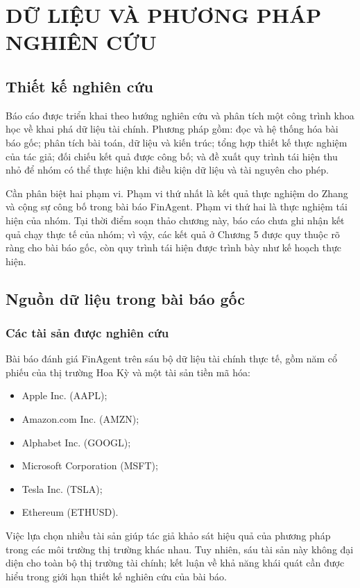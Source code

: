 \chapter{DỮ LIỆU VÀ PHƯƠNG PHÁP NGHIÊN CỨU}

\section{Thiết kế nghiên cứu}

Báo cáo được triển khai theo hướng nghiên cứu và phân tích một công trình khoa học về khai phá dữ liệu tài chính. Phương pháp gồm: đọc và hệ thống hóa bài báo gốc; phân tích bài toán, dữ liệu và kiến trúc; tổng hợp thiết kế thực nghiệm của tác giả; đối chiếu kết quả được công bố; và đề xuất quy trình tái hiện thu nhỏ để nhóm có thể thực hiện khi điều kiện dữ liệu và tài nguyên cho phép.

Cần phân biệt hai phạm vi. Phạm vi thứ nhất là kết quả thực nghiệm do Zhang và cộng sự công bố trong bài báo FinAgent. Phạm vi thứ hai là thực nghiệm tái hiện của nhóm. Tại thời điểm soạn thảo chương này, báo cáo chưa ghi nhận kết quả chạy thực tế của nhóm; vì vậy, các kết quả ở Chương 5 được quy thuộc rõ ràng cho bài báo gốc, còn quy trình tái hiện được trình bày như kế hoạch thực hiện.

\section{Nguồn dữ liệu trong bài báo gốc}

\subsection{Các tài sản được nghiên cứu}
Bài báo đánh giá FinAgent trên sáu bộ dữ liệu tài chính thực tế, gồm năm cổ phiếu của thị trường Hoa Kỳ và một tài sản tiền mã hóa:
\begin{itemize}
    \item Apple Inc. (AAPL);
    \item Amazon.com Inc. (AMZN);
    \item Alphabet Inc. (GOOGL);
    \item Microsoft Corporation (MSFT);
    \item Tesla Inc. (TSLA);
    \item Ethereum (ETHUSD).
\end{itemize}
Việc lựa chọn nhiều tài sản giúp tác giả khảo sát hiệu quả của phương pháp trong các môi trường thị trường khác nhau. Tuy nhiên, sáu tài sản này không đại diện cho toàn bộ thị trường tài chính; kết luận về khả năng khái quát cần được hiểu trong giới hạn thiết kế nghiên cứu của bài báo.

